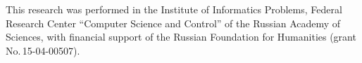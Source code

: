 


\vspace*{-12pt}

\Ack
\noindent
This research was performed in the Institute of Informatics Problems, Federal Research Center 
``Computer Science and Control'' of the Russian Academy of Sciences, with financial support of the 
Russian Foundation for Humanities (grant No.\,15-04-00507).


\vspace*{6pt}

  \begin{multicols}{2}

\renewcommand{\bibname}{\protect\rmfamily References}

{\small\frenchspacing
 {%
 \begin{thebibliography}{99}


\end{thebibliography}}}
\end{multicols}

